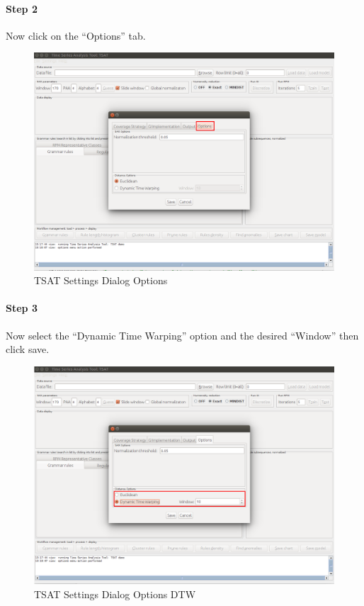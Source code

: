 \documentclass[titlepage, letterpaper, 12pt]{article}
\begin{document}
\newpage
\paragraph{Step 2}
Now click on the ``Options'' tab.

\begin{figure}[H]
	\includegraphics[width=\textwidth]{TSAT-settings-dialog-options}
	\caption{TSAT Settings Dialog Options}
	\label{fig:TSAT-settings-dialog-options}
\end{figure}

\newpage
\paragraph{Step 3}
Now select the ``Dynamic Time Warping'' option and the desired ``Window'' then click save.

\begin{figure}[H]
	\includegraphics[width=\textwidth]{TSAT-settings-dialog-options-dtw}
	\caption{TSAT Settings Dialog Options DTW}
	\label{fig:TSAT-settings-dialog-options-dtw}
\end{figure}
\end{document}
